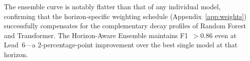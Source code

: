 \documentclass[11pt, a4paper]{article}
\begin{document}
\begin{appendices}
The ensemble curve is notably flatter than that of any individual model, confirming
that the horizon-specific weighting schedule (Appendix~\ref{app:weights})
successfully compensates for the complementary decay profiles of Random Forest and
Transformer.  The Horizon-Aware Ensemble maintains F1~$>0.86$ even at Lead~6---a
2-percentage-point improvement over the best single model at that horizon.

\end{appendices}
\end{document}
